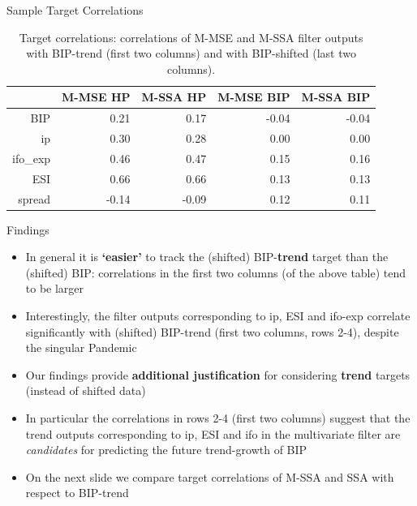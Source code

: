 \documentclass{beamer}
\begin{document}
\begin{frame} {Sample Target Correlations}\label{sample_target_cor1}
\begin{table}[ht]
\centering
\begin{tabular}{rrrrr}
  \hline
 & M-MSE HP & M-SSA HP & M-MSE BIP & M-SSA BIP \\ 
  \hline
BIP & 0.21 & 0.17 & -0.04 & -0.04 \\ 
  ip & 0.30 & 0.28 & 0.00 & 0.00 \\ 
  ifo\_exp & 0.46 & 0.47 & 0.15 & 0.16 \\ 
  ESI & 0.66 & 0.66 & 0.13 & 0.13 \\ 
  spread & -0.14 & -0.09 & 0.12 & 0.11 \\ 
   \hline
\end{tabular}
\caption{Target correlations: correlations of M-MSE and M-SSA filter outputs with BIP-trend (first two columns) and with BIP-shifted (last two columns).} 
\label{perf_var1}
\end{table}\end{frame}




\begin{frame} {Findings}\label{slide_target_cor}
\begin{itemize}
\item In general it is \textbf{`easier'} to track the (shifted) BIP-\textbf{trend} target than the (shifted) BIP: correlations in the first two columns (of the above table) tend to be larger
\item Interestingly, the filter outputs corresponding to ip, ESI and ifo-exp correlate significantly  with (shifted) BIP-trend (first two columns, rows 2-4), despite the singular Pandemic
\item Our findings provide \textbf{additional justification} for considering \textbf{trend} targets (instead of shifted data)
\item In particular the correlations in rows 2-4 (first two columns) suggest that the trend outputs corresponding to ip, ESI and ifo in the multivariate filter are \emph{candidates} for predicting the future trend-growth of BIP
\item On the next slide we compare target correlations of M-SSA and SSA with respect to BIP-trend  
\end{itemize}
\end{frame}
\end{document}
